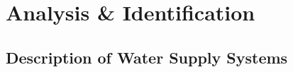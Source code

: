 
\part{Analysis \& Identification}
\label{system_analysis}

\chapter{Description of Water Supply Systems}
\label{description_of_water_supply_systems}

 

 
























